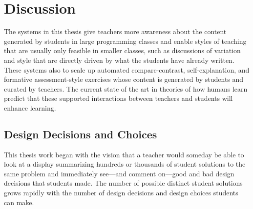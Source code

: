 \chapter{Discussion}\label{chapter:discussion}

The systems in this thesis give teachers more awareness about the content generated by students in large programming classes and enable styles of teaching that are usually only feasible in smaller classes, such as discussions of variation and style that are directly driven by what the students have already written. These systems also to scale up automated compare-contrast, self-explanation, and formative assessment-style exercises whose content is generated by students and curated by teachers.  The current state of the art in theories of how humans learn predict that these supported interactions between teachers and students will enhance learning.




\section{Design Decisions and Choices}


This thesis work began with the vision that a teacher would someday be able to look at a display summarizing hundreds or thousands of student solutions to the same problem and immediately see---and comment on---good and bad design decisions that students made. The number of possible distinct student solutions grows rapidly with the number of design decisions and design choices students can make. 

